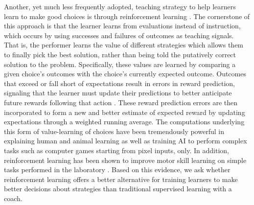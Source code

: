 Another, yet much less frequently adopted, teaching strategy to help learners learn to make good choices is through reinforcement learning \cite{sutton_reinforcement_2018}. The cornerstone of this approach is that the learner learns from evaluations instead of instruction, which occurs by using successes and failures of outcomes as teaching signals. That is, the performer learns the value of different strategies which allows them to finally pick the best solution, rather than being told the putatively correct solution to the problem. Specifically, these values are learned by comparing a given choice's outcomes with the choice's currently expected outcome. Outcomes that exceed or fall short of expectations result in errors in reward prediction, signaling that the learner must update their predictions to better anticipate future rewards following that action \cite{rescorla_theory_1972}. These reward prediction errors are then incorporated to form a new and better estimate of expected reward by updating expectations through a weighted running average. The computations underlying this form of value-learning of choices have been tremendously powerful in explaining human and animal learning \cite{waelti_dopamine_2001, schultz_neural_1997, pessiglione_dopamine-dependent_2006,lee_neural_2012, law_reinforcement_2009, tobler_human_2006} as well as training AI to perform complex tasks such as computer games starting from pixel inputs, only\cite{mnih_human-level_2015}. In addition, reinforcement learning has been shown to improve motor skill learning on simple tasks performed in the laboratory \cite{lior_shmuelof_overcoming_2012, abe_reward_2011, truong_error-based_2023, hasson_reinforcement_2015}. Based on this evidence, we ask whether reinforcement learning offers a better alternative for training learners to make better decisions about strategies than traditional supervised learning with a coach. 

